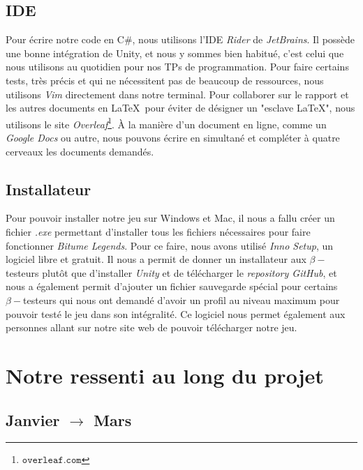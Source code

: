 \documentclass[a4paper,12pt]{article}
\newcommand{\btmlgs}{\textsl{Bitume Legends}}
\begin{document}
        \subsection{IDE}
            Pour écrire notre code en C\#, nous utilisons l'IDE \textsl{Rider} de 
            \textsl{JetBrains}. Il possède une bonne intégration de Unity, et nous
            y sommes bien habitué, c'est celui que nous utilisons au quotidien pour
            nos TPs de programmation. Pour faire certains tests, très précis et qui
            ne nécessitent pas de beaucoup de ressources, nous utilisons \textsl{Vim}
            directement dans notre terminal.
            Pour collaborer sur le rapport et les autres documents en \LaTeX\, 
            pour éviter de désigner un "esclave \LaTeX", nous utilisons le site 
            \textsl{Overleaf}\footnote{\(\mathtt{overleaf.com}\)}. 
            À la manière d'un document en ligne, comme 
            un \textsl{Google Docs} ou autre, nous pouvons écrire en
            simultané et compléter à quatre cerveaux les documents demandés.
            
        \subsection{Installateur} 
         
        Pour pouvoir installer notre jeu sur Windows et Mac, il nous a fallu créer un fichier \textsl{.exe} permettant d'installer tous les fichiers nécessaires pour faire fonctionner \btmlgs.
        Pour ce faire, nous avons utilisé \textsl{Inno Setup}, un logiciel libre et gratuit. Il nous a permit de donner un installateur aux \(\beta-\)testeurs plutôt que d'installer \textsl{Unity}
        et de télécharger le \textsl{repository GitHub}, et nous a également permit d'ajouter un fichier sauvegarde spécial pour certains \(\beta-\)testeurs qui nous ont demandé d'avoir un profil au niveau maximum pour pouvoir testé le jeu dans son intégralité. Ce logiciel nous permet également aux personnes allant sur notre site web de pouvoir télécharger notre jeu.

    
    \section{Notre ressenti au long du projet}
    \subsection{Janvier $\to$ Mars}
\end{document}
